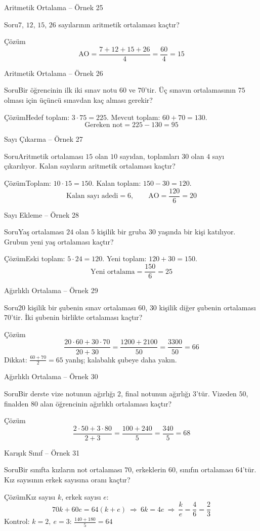 \documentclass[aspectratio=169,11pt,handout]{beamer}
\newcommand{\soru}[3]{%
\begin{frame}{#1}
  \begin{block}{Soru}\large #2\end{block}
  \pause
  \begin{exampleblock}{Çözüm}\large #3\end{exampleblock}
\end{frame}}
\begin{document}
\soru{Aritmetik Ortalama -- Örnek 25}
{\(7\), \(12\), \(15\), \(26\) sayılarının aritmetik ortalaması kaçtır?}
{\[\text{AO}=\frac{7+12+15+26}{4}=\frac{60}{4}=15\]}

\soru{Aritmetik Ortalama -- Örnek 26}
{Bir öğrencinin ilk iki sınav notu \(60\) ve \(70\)'tir. Üç sınavın ortalamasının \(75\) olması için üçüncü sınavdan kaç alması gerekir?}
{Hedef toplam: \(3\cdot 75=225\). \quad Mevcut toplam: \(60+70=130\).
\[\text{Gereken not}=225-130=95\]}

\soru{Sayı Çıkarma -- Örnek 27}
{Aritmetik ortalaması \(15\) olan \(10\) sayıdan, toplamları \(30\) olan \(4\) sayı çıkarılıyor. Kalan sayıların aritmetik ortalaması kaçtır?}
{Toplam: \(10\cdot 15=150\). \quad Kalan toplam: \(150-30=120\).
\[\text{Kalan sayı adedi}=6,\qquad \text{AO}=\frac{120}{6}=20\]}

\soru{Sayı Ekleme -- Örnek 28}
{Yaş ortalaması \(24\) olan \(5\) kişilik bir gruba \(30\) yaşında bir kişi katılıyor. Grubun yeni yaş ortalaması kaçtır?}
{Eski toplam: \(5\cdot 24=120\). \quad Yeni toplam: \(120+30=150\).
\[\text{Yeni ortalama}=\frac{150}{6}=25\]}

\soru{Ağırlıklı Ortalama -- Örnek 29}
{\(20\) kişilik bir şubenin sınav ortalaması \(60\), \(30\) kişilik diğer şubenin ortalaması \(70\)'tir. İki şubenin birlikte ortalaması kaçtır?}
{\[\frac{20\cdot 60+30\cdot 70}{20+30}=\frac{1200+2100}{50}=\frac{3300}{50}=66\]
Dikkat: \(\frac{60+70}{2}=65\) yanlış; kalabalık şubeye daha yakın.}

\soru{Ağırlıklı Ortalama -- Örnek 30}
{Bir derste vize notunun ağırlığı \(2\), final notunun ağırlığı \(3\)'tür. Vizeden \(50\), finalden \(80\) alan öğrencinin ağırlıklı ortalaması kaçtır?}
{\[\frac{2\cdot 50+3\cdot 80}{2+3}=\frac{100+240}{5}=\frac{340}{5}=68\]}

\soru{Karışık Sınıf -- Örnek 31}
{Bir sınıfta kızların not ortalaması \(70\), erkeklerin \(60\), sınıfın ortalaması \(64\)'tür. Kız sayısının erkek sayısına oranı kaçtır?}
{Kız sayısı \(k\), erkek sayısı \(e\):
\[70k+60e=64(k+e)\ \Rightarrow\ 6k=4e\ \Rightarrow\ \frac{k}{e}=\frac{4}{6}=\frac{2}{3}\]
Kontrol: \(k=2,\ e=3\): \(\frac{140+180}{5}=64\) \checkmark}
\end{document}
